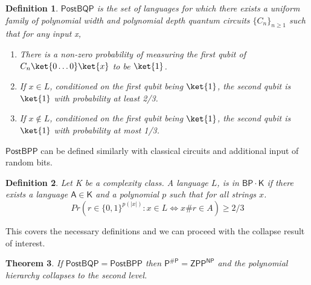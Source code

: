\documentclass{article}
\newtheorem{theorem}{Theorem}
\newtheorem{definition}[theorem]{Definition}
\begin{document}
\begin{definition}
$\mathsf{PostBQP}$ is the set of languages for which there exists a uniform family of polynomial width and polynomial depth quantum circuits $\{C_n\}_ {n\geq 1}$ such that for any input x,
\begin{enumerate}[label=(\roman*)]
    \item There is a non-zero probability of measuring the first qubit of $C_n \ket{0\ldots 0}\ket{x}$ to be $\ket{1}$.
    \item If $x\in L$, conditioned on the first qubit being $\ket{1}$, the second qubit is $\ket{1}$ with probability at least 2/3.
    \item If $x\notin L$, conditioned on the first qubit being $\ket{1}$, the second qubit is $\ket{1}$ with probability at most 1/3.
\end{enumerate}
\end{definition}

$\mathsf{PostBPP}$ can be defined similarly with classical circuits and additional input of random bits.

\begin{definition}
    Let K be a complexity class. A language $L$, is in $\mathsf{BP\cdot K}$ if there exists a language $\mathsf{A \in K}$ and a polynomial $p$ such that for all strings $x$.
$$Pr(r \in \{0,1\}^{p(|x|)}: x \in L \iff x\#r \in A) \geq 2/3$$
\end{definition}

This covers the necessary definitions and we can proceed with the collapse result of interest.

\begin{theorem}\label{thm: postbqp postbpp}
    If $\mathsf{PostBQP=PostBPP}$ then $\mathsf{P^{\#P}=ZPP^{NP}}$ and the polynomial hierarchy collapses to the second level.
\end{theorem}
\end{document}
